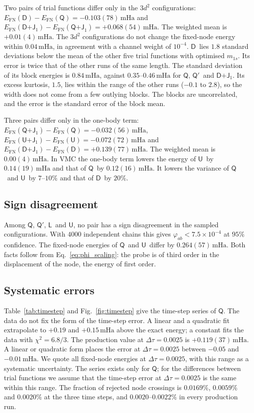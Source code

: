 \documentclass[aps,prb,reprint,amsmath,amssymb,superscriptaddress,nofootinbib]{revtex4-2}
\newcommand{\mQ}{\ensuremath{\textsf{Q}}}
\newcommand{\mQb}{\ensuremath{\textsf{Q}'}}
\newcommand{\mL}{\ensuremath{\textsf{L}}}
\newcommand{\mU}{\ensuremath{\textsf{U}}}
\newcommand{\mQJ}{\ensuremath{\textsf{Q+J}_1}}
\newcommand{\mUJ}{\ensuremath{\textsf{U+J}_1}}
\newcommand{\mD}{\ensuremath{\textsf{D}}}
\newcommand{\mDJ}{\ensuremath{\textsf{D+J}_1}}
\newcommand{\mHa}{\,\mathrm{mHa}}
\begin{document}
Two pairs of trial functions differ only in the $3d^2$ configurations:
$E_{\mathrm{FN}}(\mD) - E_{\mathrm{FN}}(\mQ) = -0.103(78)\mHa$ and
$E_{\mathrm{FN}}(\mDJ) - E_{\mathrm{FN}}(\mQJ) = +0.068(54)\mHa$. The weighted
mean is $+0.01(4)\mHa$. The $3d^2$ configurations do not change the
fixed-node energy within $0.04\mHa$, in agreement with a channel weight of
$10^{-4}$. \mD\ lies $1.8$ standard deviations below the mean of the other
five trial functions with optimised $m_{1s}$. Its error is twice that of the
other runs of the same length. The standard deviation of its block energies is $0.84\mHa$, against
$0.35$--$0.46\mHa$ for \mQ, \mQb\ and \mDJ. Its excess kurtosis, $1.5$, lies
within the range of the other runs ($-0.1$ to $2.8$), so the width does not
come from a few outlying blocks. The blocks are uncorrelated, and the error is
the standard error of the block mean.

Three pairs differ only in the one-body term:
$E_{\mathrm{FN}}(\mQJ) - E_{\mathrm{FN}}(\mQ) = -0.032(56)\mHa$,
$E_{\mathrm{FN}}(\mUJ) - E_{\mathrm{FN}}(\mU) = -0.072(72)\mHa$ and
$E_{\mathrm{FN}}(\mDJ) - E_{\mathrm{FN}}(\mD) = +0.139(77)\mHa$. The weighted
mean is $0.00(4)\mHa$. In VMC the one-body term lowers the energy of \mU\ by
$0.14(19)\mHa$ and that of \mQ\ by $0.12(16)\mHa$. It lowers the variance of
\mQ\ and \mU\ by $7$--$10\%$ and that of \mD\ by $20\%$.

\subsection{Sign disagreement}
\label{ssec:sign_results}

Among \mQ, \mQb, \mL\ and \mU, no pair has a sign disagreement in the sampled
configurations. With $4000$ independent chains this gives
$\varphi_{ab} < 7.5\times10^{-4}$ at $95\%$ confidence. The fixed-node
energies of \mQ\ and \mU\ differ by $0.264(57)\mHa$. Both facts follow from
Eq.~\eqref{eq:phi_scaling}: the probe is of third order in the displacement of
the node, the energy of first order.

\subsection{Systematic errors}
\label{ssec:systematics}

Table~\ref{tab:timestep} and Fig.~\ref{fig:timestep} give the time-step series
of \mQ. The data do not fix the form of the time-step error. A linear and a
quadratic fit extrapolate to $+0.19$ and $+0.15\mHa$ above the exact energy;
a constant fits the data with $\chi^2 = 6.8/3$. The production value at
$\Delta\tau = 0.0025$ is $+0.119(37)\mHa$. A linear or quadratic form places
the error at $\Delta\tau = 0.0025$ between $-0.05$ and $-0.01\mHa$. We quote
all fixed-node energies at $\Delta\tau = 0.0025$, with this range as a
systematic uncertainty. The series exists only for \mQ; for the differences
between trial functions we assume that the time-step error at
$\Delta\tau = 0.0025$ is the same within this range. The fraction of rejected
node crossings is $0.0169\%$, $0.0059\%$ and $0.0020\%$ at the three time
steps, and $0.0020$--$0.0022\%$ in every production run.
\end{document}
